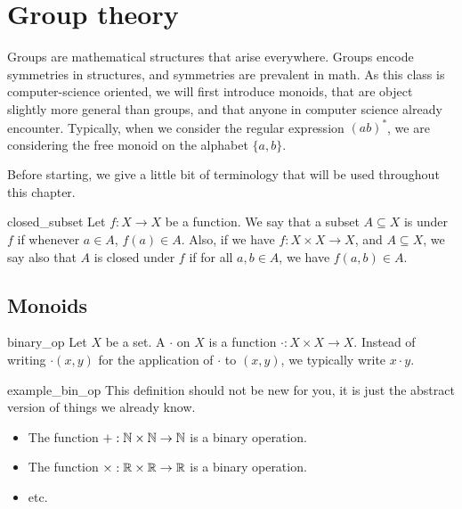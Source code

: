 \section{Group theory}

Groups are mathematical structures that arise everywhere. Groups encode symmetries in structures, and symmetries are prevalent in math.  As this class is computer-science oriented, we will first introduce monoids, that are object slightly more general than groups, and that anyone in computer science already encounter. Typically, when we consider the regular expression \( (ab)^* \), we are considering the free monoid on the alphabet \( \{ a, b \} \). 

Before starting, we give a little bit of terminology that will be used throughout this chapter.
\begin{cdef}{}{closed_subset}
    Let \( f : X \to X \) be a function. We say that a subset \( A \subseteq X \) is  under \( f \) if whenever \( a \in A \), \( f(a) \in A \). Also, if we have \( f : X\times X \to X \), and \( A \subseteq X \), we say also that \( A \) is closed under \( f \) if for all \( a, b \in  A \), we have \( f(a, b) \in A \). 
\end{cdef}

\subsection{Monoids}

\begin{cdef}{}{binary_op}
    Let \( X \) be a set. A  \( \cdot \) on \( X \) is a function \( \cdot : X \times X \to X \). Instead of writing \( \cdot(x, y) \) for the application of \( \cdot \) to \( (x, y) \), we typically write \( x \cdot y \).
\end{cdef}

\begin{cexp}{}{example_bin_op}
    This definition should not be new for you, it is just the abstract version of things we already know. 
    \begin{itemize}
        \item The function \( + : \mathbb{N} \times \mathbb{N} \to \mathbb{N} \) is a binary operation.
        \item The function \( \times : \mathbb{R} \times \mathbb{R} \to \mathbb{R} \) is a binary operation.
        \item etc.
    \end{itemize}
\end{cexp}

